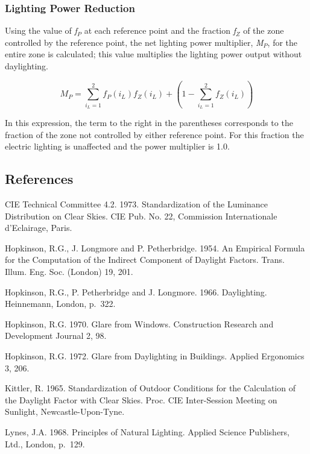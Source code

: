 \subsubsection{Lighting Power Reduction}\label{lighting-power-reduction}

Using the value of \emph{f\(_{P}\)} at each reference point and the fraction \emph{f\(_{Z}\)} of the zone controlled by the reference point, the net lighting power multiplier, \emph{M\(_{P}\)}, for the entire zone is calculated; this value multiplies the lighting power output without daylighting.

\begin{equation}
{M_P} = \sum\limits_{{i_L} = 1}^2 {{f_P}({i_L})} {f_Z}({i_L}) + \left( {1 - \sum\limits_{{i_L} = 1}^2 {} {f_Z}({i_L})} \right)
\end{equation}

In this expression, the term to the right in the parentheses corresponds to the fraction of the zone not controlled by either reference point. For this fraction the electric lighting is unaffected and the power multiplier is 1.0.

\subsection{References}\label{references-045}

CIE Technical Committee 4.2. 1973. Standardization of the Luminance Distribution on Clear Skies. CIE Pub. No. 22, Commission Internationale d'Eclairage, Paris.

Hopkinson, R.G., J. Longmore and P. Petherbridge. 1954. An Empirical Formula for the Computation of the Indirect Component of Daylight Factors. Trans. Illum. Eng. Soc. (London) 19, 201.

Hopkinson, R.G., P. Petherbridge and J. Longmore. 1966. Daylighting. Heinnemann, London, p.~322.

Hopkinson, R.G. 1970. Glare from Windows. Construction Research and Development Journal 2, 98.

Hopkinson, R.G. 1972. Glare from Daylighting in Buildings. Applied Ergonomics 3, 206.

Kittler, R. 1965. Standardization of Outdoor Conditions for the Calculation of the Daylight Factor with Clear Skies. Proc. CIE Inter-Session Meeting on Sunlight, Newcastle-Upon-Tyne.

Lynes, J.A. 1968. Principles of Natural Lighting. Applied Science Publishers, Ltd., London, p.~129.

